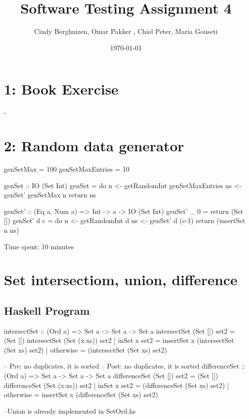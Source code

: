 \documentclass{article}
\begin{document}
\setlength{\parindent}{0cm}

\title{Software Testing Assignment 4}
\author{Cindy Berghuizen, Omar Pakker , Chiel Peter, Maria Gouseti}
\date{\today}
\maketitle
\section*{1: Book Exercise}
-
\section*{2: Random data generator}

\begin{code}
genSetMax = 100
genSetMaxEntries = 10

genSet :: IO (Set Int)
genSet =  do
   n  <- getRandomInt genSetMaxEntries
   ns <- genSet' genSetMax n
   return ns

genSet' :: (Eq a, Num a) => Int -> a -> IO (Set Int)
genSet' _ 0 = return (Set [])
genSet' d c = do
         n <- getRandomInt d
         ns <- genSet' d (c-1)
         return (insertSet n ns)

\end{code}
Time spent: 10 minutes

\section*{Set intersectiom, union, difference}

\subsection*{Haskell Program}
\begin{code}
intersectSet :: (Ord a) => Set a -> Set a -> Set a 
intersectSet (Set [])     set2  =  (Set [])
intersectSet (Set (x:xs)) set2  | inSet x set2 = insertSet x (intersectSet (Set xs) set2)
                                | otherwise = (intersectSet (Set xs) set2)

-- Pre: no duplicates, it is sorted
-- Post: no duplicates, it is sorted 
differenceSet :: (Ord a) => Set a -> Set a -> Set a
differenceSet (Set [])     set2  =  (Set [])
differenceSet (Set (x:xs)) set2  | inSet x set2 = (differenceSet (Set xs) set2)
                                 | otherwise = insertSet x (differenceSet (Set xs) set2)                             

--Union is already implemented in SetOrd.hs
\end{code}
\end{document}

